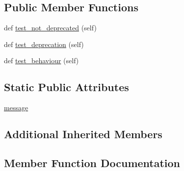 \subsection*{Public Member Functions}
\begin{DoxyCompactItemize}
\item 
def \hyperlink{classnumpy_1_1core_1_1tests_1_1test__deprecations_1_1TestUFuncForcedDTypeWarning_a9f269453b1348f28effcdba4059ea157}{test\+\_\+not\+\_\+deprecated} (self)
\item 
def \hyperlink{classnumpy_1_1core_1_1tests_1_1test__deprecations_1_1TestUFuncForcedDTypeWarning_a4667b5580e7679c6f99c0eb99c7af9b1}{test\+\_\+deprecation} (self)
\item 
def \hyperlink{classnumpy_1_1core_1_1tests_1_1test__deprecations_1_1TestUFuncForcedDTypeWarning_a47ce9c745be5e1189ebb81659ca92b8f}{test\+\_\+behaviour} (self)
\end{DoxyCompactItemize}
\subsection*{Static Public Attributes}
\begin{DoxyCompactItemize}
\item 
\hyperlink{classnumpy_1_1core_1_1tests_1_1test__deprecations_1_1TestUFuncForcedDTypeWarning_a72c0eca9606f8e5b8add874a7ea2bf96}{message}
\end{DoxyCompactItemize}
\subsection*{Additional Inherited Members}


\subsection{Member Function Documentation}
\mbox{\label{classnumpy_1_1core_1_1tests_1_1test__deprecations_1_1TestUFuncForcedDTypeWarning_a47ce9c745be5e1189ebb81659ca92b8f}} 
